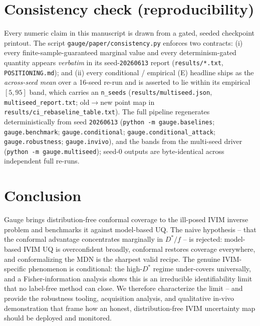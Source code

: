 \documentclass[11pt]{article}
\newcommand{\Dstar}{D^{*}}
\begin{document}
\section{Consistency check (reproducibility)}
\label{sec:consistency}
Every numeric claim in this manuscript is drawn from a gated, seeded checkpoint
printout. The script \texttt{gauge/paper/consistency.py} enforces two contracts:
(i) every finite-sample-guaranteed marginal value and every determinism-gated
quantity appears \emph{verbatim} in its seed-\texttt{20260613} report
(\texttt{results/*.txt}, \texttt{POSITIONING.md}); and (ii) every conditional /
empirical (E) headline ships as the \emph{across-seed mean} over a 16-seed re-run
and is asserted to lie within its empirical $[5,95]$ band, which carries an
\texttt{n\_seeds} (\texttt{results/multiseed.json}, \texttt{multiseed\_report.txt};
old$\to$new point map in \texttt{results/ci\_rebaseline\_table.txt}). The full
pipeline regenerates deterministically from seed \texttt{20260613}
(\texttt{python -m gauge.baselines}; \texttt{gauge.benchmark};
\texttt{gauge.conditional}; \texttt{gauge.conditional\_attack};
\texttt{gauge.robustness}; \texttt{gauge.invivo}), and the bands from the multi-seed
driver (\texttt{python -m gauge.multiseed}); seed-0 outputs are byte-identical
across independent full re-runs.

\section{Conclusion}
Gauge brings distribution-free conformal coverage to the ill-posed IVIM inverse
problem and benchmarks it against model-based UQ. The naive hypothesis -- that the
conformal advantage concentrates marginally in $\Dstar/f$ -- is rejected:
model-based IVIM UQ is overconfident broadly, conformal restores coverage
everywhere, and conformalizing the MDN is the sharpest valid recipe. The genuine
IVIM-specific phenomenon is conditional: the high-$\Dstar$ regime under-covers
universally, and a Fisher-information analysis shows this is an irreducible
identifiability limit that no label-free method can close. We therefore characterize
the limit -- and provide the robustness tooling, acquisition analysis, and
qualitative in-vivo demonstration that frame how an honest, distribution-free IVIM
uncertainty map should be deployed and monitored.
\end{document}
